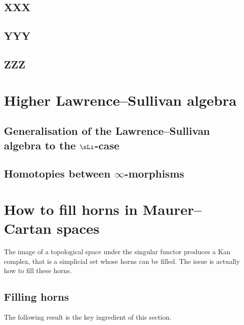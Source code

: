 \documentclass[twoside, 10pt]{amsart}
\begin{document}
\subsection{XXX}

\subsection{YYY}

\subsection{ZZZ}

\section{Higher Lawrence--Sullivan algebra \daniel{[Daniel]} \bruno{[Bruno]}}

\subsection{Generalisation of the Lawrence--Sullivan algebra to the $\sLi$-case \daniel{[Daniel]}}



\subsection{Homotopies between \texorpdfstring{$\infty$}{infinity}-morphisms \bruno{[Bruno]}}

\section{How to fill horns in Maurer--Cartan spaces\bruno{[Bruno]}}

The image of a topological space under the singular  functor produces a Kan complex, that is a simplicial set whose horns can be filled. The issue is actually how to fill these horns. 


\subsection{Filling horns \bruno{[Bruno]}}

The following result is the key ingredient of this section. 
\end{document}
